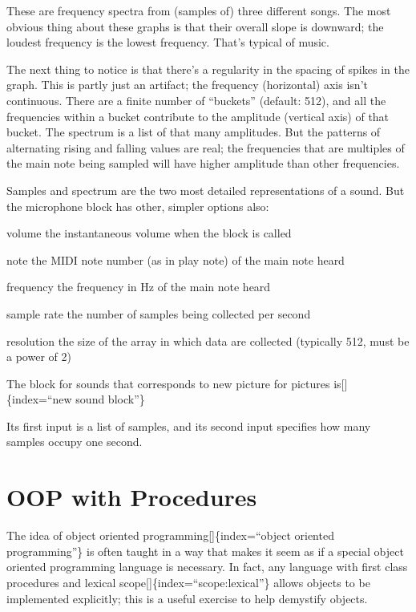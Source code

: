\documentclass[
  letterpaper,
]{book}
\begin{document}
These are frequency spectra from (samples of) three different songs. The
most obvious thing about these graphs is that their overall slope is
downward; the loudest frequency is the lowest frequency. That's typical
of music.

The next thing to notice is that there's a regularity in the spacing of
spikes in the graph. This is partly just an artifact; the frequency
(horizontal) axis isn't continuous. There are a finite number of
``buckets'' (default: 512), and all the frequencies within a bucket
contribute to the amplitude (vertical axis) of that bucket. The spectrum
is a list of that many amplitudes. But the patterns of alternating
rising and falling values are real; the frequencies that are multiples
of the main note being sampled will have higher amplitude than other
frequencies.

Samples and spectrum are the two most detailed representations of a
sound. But the microphone block has other, simpler options also:

volume the instantaneous volume when the block is called

note the MIDI note number (as in play note) of the main note heard

frequency the frequency in Hz of the main note heard

sample rate the number of samples being collected per second

resolution the size of the array in which data are collected (typically
512, must be a power of 2)

The block for sounds that corresponds to new picture for pictures
is{[}{]}\{index=``new sound block''\}

Its first input is a list of samples, and its second input specifies how
many samples occupy one second.


\chapter{OOP with Procedures}\label{oop-with-procedures}

The idea of object oriented programming{[}{]}\{index=``object oriented
programming''\} is often taught in a way that makes it seem as if a
special object oriented programming language is necessary. In fact, any
language with ﬁrst class procedures and lexical
scope{[}{]}\{index=``scope:lexical''\} allows objects to be implemented
explicitly; this is a useful exercise to help demystify objects.
\end{document}
